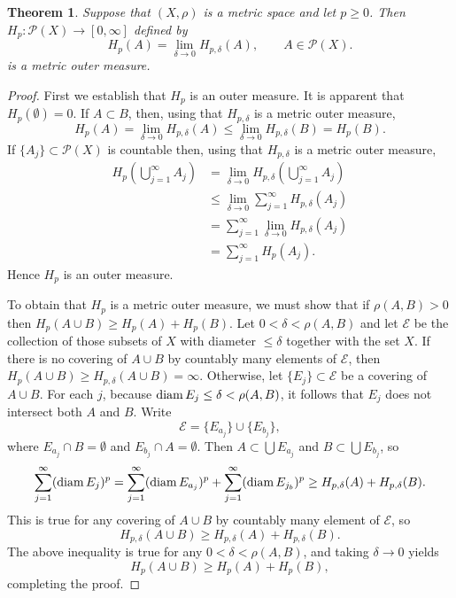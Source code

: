\documentclass{article}
\newcommand{\diam}{\ensuremath\mathrm{diam}\,}
\newtheorem{theorem}{Theorem}
\theoremstyle{definition}
\begin{document}
\begin{theorem}
Suppose that $(X,\rho)$ is a metric space and let $p \geq 0$. Then $H_p:\mathscr{P}(X) \to [0,\infty]$
defined by
\[
H_p(A) = \lim_{\delta \to 0} H_{p,\delta}(A), \qquad A \in \mathscr{P}(X).
\]
 is a metric outer measure.
\end{theorem}
\begin{proof}
First we establish that $H_p$ is an outer measure. It is apparent that $H_p(\emptyset)=0$. If $A \subset B$, then, using that $H_{p,\delta}$ is a metric outer measure,
\[
H_p(A)=\lim_{\delta \to 0} H_{p,\delta}(A)
\leq \lim_{\delta \to 0} H_{p,\delta}(B)=H_p(B).
\]
If $\{A_j\} \subset \mathscr{P}(X)$ is countable then, using that $H_{p,\delta}$ is a metric outer measure,
\begin{align*}
H_p\left(\bigcup_{j=1}^\infty A_j \right) &= 
\lim_{\delta \to 0} H_{p,\delta} \left(\bigcup_{j=1}^\infty A_j \right) \\
&\leq \lim_{\delta \to 0} \sum_{j=1}^\infty H_{p,\delta}(A_j)\\
&=\sum_{j=1}^\infty \lim_{\delta \to 0} H_{p,\delta}(A_j)\\
&=\sum_{j=1}^\infty H_p(A_j).
\end{align*}
Hence $H_p$ is an outer measure.

To obtain that $H_p$ is a metric outer measure, we must 
show that if   $\rho(A,B)>0$ then $H_p(A \cup B) \geq H_p(A) + H_p(B)$. 
Let $0<\delta<\rho(A,B)$ and let $\mathscr{E}$ be the collection of those subsets of $X$ with diameter $\leq \delta$ together with the set $X$.
If there is no covering of $A \cup B$ by countably many elements of $\mathscr{E}$, then  
$H_p(A \cup B) \geq H_{p,\delta}(A \cup B) =\infty$. Otherwise, let $\{E_j\} \subset \mathscr{E}$ be a covering of $A \cup B$.
For each $j$, because $\diam E_j \leq \delta < \rho(A,B)$, it follows that $E_j$ does not intersect both $A$ and $B$.
Write
\[
\mathscr{E} = \{E_{a_j}\} \cup \{E_{b_j}\},
\]
where $E_{a_j} \cap B = \emptyset$ and $E_{b_j} \cap A = \emptyset$. Then $A \subset \bigcup E_{a_j}$ and 
$B \subset \bigcup E_{b_j}$, so
\[
\sum_{j=1}^\infty (\diam E_j)^p
= \sum_{j=1}^\infty (\diam E_{a_j})^p + \sum_{j=1}^\infty (\diam E_{j_b})^p
\geq H_{p,\delta}(A)+H_{p,\delta}(B).
\]
This is true for any covering of $A \cup B$ by countably many element of $\mathscr{E}$, so
\[
H_{p,\delta}(A \cup B) \geq H_{p,\delta}(A) + H_{p,\delta}(B).
\]
The above inequality is true for any $0<\delta<\rho(A,B)$, and taking $\delta \to 0$ yields
\[
H_p(A \cup B) \geq H_p(A) + H_p(B),
\]
completing the proof.
\end{proof}
\end{document}
